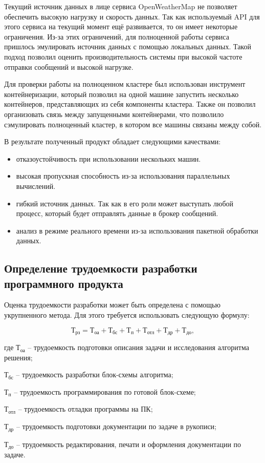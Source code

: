 Текущий источник данных в лице сервиса OpenWeatherMap не позволяет обеспечить высокую нагрузку и скорость данных.
Так как используемый API для этого сервиса на текущий момент ещё развивается, то он имеет некоторые ограничения.
Из-за этих ограничений, для полноценной работы сервиса пришлось эмулировать источник данных с помощью локальных данных.
Такой подход позволил оценить производительность системы при высокой частоте отправки сообщений и высокой нагрузке.

Для проверки работы на полноценном кластере был использован инструмент контейнеризации, который позволил на одной машине запустить несколько контейнеров, представляющих из себя компоненты кластера.
Также он позволил организовать связь между запущенными контейнерами, что позволило сэмулировать полноценный кластер, в котором все машины связаны между собой.

В результате полученный продукт обладает следующими качествами:
\begin{itemize}
  \item отказоустойчивость при использовании нескольких машин.
  \item высокая пропускная способность из-за использования параллельных вычислений.
  \item гибкий источник данных. Так как в его роли может выступать любой процесс, который будет отправлять данные в брокер сообщений.
  \item анализ в режиме реального времени из-за использования пакетной обработки данных. 
\end{itemize}

\subsection{Определение трудоемкости разработки программного продукта}

Оценка трудоемкости разработки может быть определена с помощью укрупненного метода.
Для этого требуется использовать следующую формулу:

\begin{equation}
  \label{eq:econ:Trz}
  \text{Т}_\text{рз} = \text{Т}_\text{оа} +
    \text{Т}_\text{бс} +
    \text{Т}_\text{п} +
    \text{Т}_\text{отл} +
    \text{Т}_\text{др} +
    \text{Т}_\text{до} ,
\end{equation}
\begin{explanationx}
  \item[где] $ \text{Т}_\text{оа} $ -- трудоемкость подготовки описания задачи и исследования алгоритма решения;
  \item $ \text{Т}_\text{бс} $ -- трудоемкость разработки блок-схемы алгоритма;
  \item $ \text{Т}_\text{п} $ -- трудоемкость программирования по готовой блок-схеме;
  \item $ \text{Т}_\text{отл} $ -- трудоемкость отладки программы на ПК;
  \item $ \text{Т}_\text{др} $ -- трудоемкость подготовки документации по задаче в рукописи;
  \item $ \text{Т}_\text{до} $ -- трудоемкость редактирования, печати и оформления документации по задаче.
\end{explanationx}

